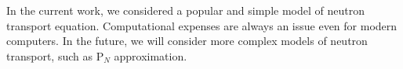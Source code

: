 \documentclass[authoryear]{elsarticle}
\begin{document}
In the current work, we considered a popular and simple model of neutron transport equation.
Computational expenses are always an issue even for modern computers.
In the future, we will consider more complex models of neutron transport, such as P$_N$ approximation. 


%
%
%
%
%
%
%
%
%
%
\end{document}
